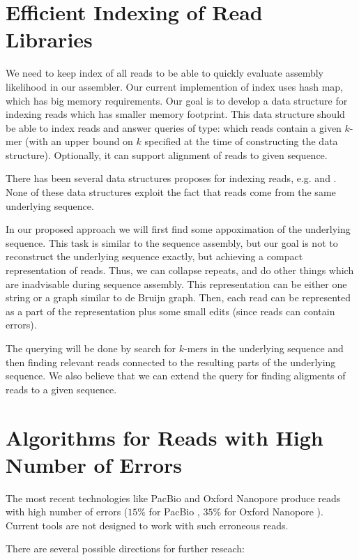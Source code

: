\section{Efficient Indexing of Read Libraries}

We need to keep index of all reads to be
able to quickly evaluate assembly likelihood in our assembler.
Our current implemention of index uses hash map, which
has big memory requirements.
Our goal is to develop a data structure for indexing
reads which has smaller memory footprint.
This data structure should be able to index reads
and answer queries of type: which reads contain
a given $k$-mer (with an upper bound on $k$ specified at the time
of constructing the data structure). Optionally,
it can support alignment of reads to given sequence.

There has been several data structures proposes for
indexing reads, e.g. \cite{GKArrays} and \cite{CGKArrays}.
None of these data structures exploit the fact
that reads come from the same underlying sequence.

In our proposed approach we will
first find some appoximation of the underlying sequence.
This task is similar to the sequence assembly, but our goal
is not to reconstruct the underlying sequence exactly, but achieving a compact
representation of reads. Thus, we can collapse repeats, and do other things
which are inadvisable during sequence assembly.
This representation can be either one string or a graph similar to
de Bruijn graph. Then, each read can be represented
as a part of the representation plus some small edits (since
reads can contain errors).

The querying will be done by search for $k$-mers in the underlying
sequence and then finding relevant reads connected to the resulting
parts of the underlying sequence. We also believe
that we can extend the query for finding aligments of reads to a given sequence.

\section{Algorithms for Reads with High Number of Errors}

The most recent technologies like PacBio \citep{PacbioToCA} and Oxford
Nanopore \citep{oxford} produce reads with high number of errors
($15\%$ for PacBio \citep{PacbioToCA}, $35\%$ for Oxford Nanopore \citep{oxford}).
Current tools are not designed to work with such erroneous reads.

There are several possible directions for further reseach:

